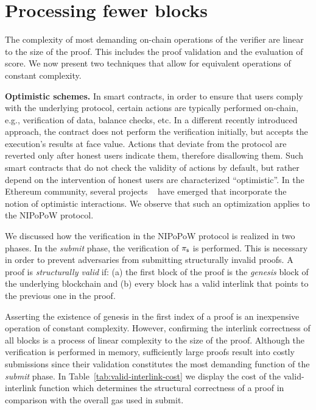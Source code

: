 \section{Processing fewer blocks}

The complexity of most demanding on-chain operations of the verifier are linear
to the size of the proof. This includes the proof validation and the evaluation
of score. We now present two techniques that allow for equivalent operations of
constant complexity.

\noindent \textbf{Optimistic schemes.} In smart contracts, in order to ensure that users
comply with the underlying protocol, certain actions are typically
performed on-chain, e.g., verification of data, balance checks, etc. In a
different recently introduced approach, the contract does not perform the
verification initially, but accepts the execution's results at face value.
Actions that deviate from the protocol are reverted only after
honest users indicate them, therefore disallowing them.
Such smart contracts that do not check the validity of actions by default, but
rather depend on the intervention of honest users are characterized
``optimistic''. In the Ethereum community, several projects ~\cite{piza,plasma,rollups-1,rollups-2} have emerged that incorporate the notion of
optimistic interactions. We observe that such an optimization applies to the
NIPoPoW protocol.

We discussed how the verification in the NIPoPoW protocol is realized in two
phases. In the \emph{submit} phase, the verification of $\mathsf{\pi_{s}}$ is performed.
This is necessary in order to prevent adversaries from submitting structurally
invalid proofs. A proof is \emph{structurally valid} if:
(a) the first block of the proof is the
\emph{genesis} block of the underlying blockchain and
(b) every block has a valid
interlink that points to the previous one in the proof.

Asserting the existence of genesis in the first index of a proof is an
inexpensive operation of constant complexity. However, confirming the interlink
correctness of all blocks is a process of linear complexity to the size of the
proof. Although the verification is performed in memory, sufficiently large
proofs result into costly submissions since their validation constitutes the most
demanding function of the \emph{submit} phase. In
Table~\ref{tab:valid-interlink-cost} we display the cost of the
\textsf{valid-interlink} function which determines the structural correctness
of a proof in comparison with the overall gas used in \textsf{submit}.

